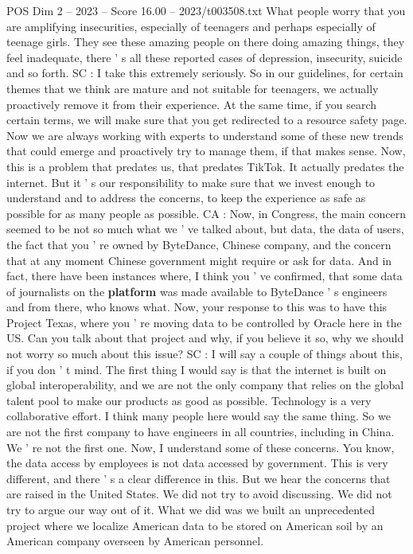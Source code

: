 \begin{textsample}{POS Dim 2 – 2023 – Score 16.00 – 2023/t003508.txt}
What people worry that you are amplifying insecurities, especially of teenagers and perhaps especially of teenage girls.
They see these amazing people on there doing amazing things, they feel inadequate, there ' s all these reported cases of depression, insecurity, suicide and so forth.
SC : I take this extremely seriously.
So in our guidelines, for certain themes that we think are mature and not suitable for teenagers, we actually proactively remove it from their experience.
At the same time, if you search certain terms, we will make sure that you get redirected to a resource safety page.
Now we are always working with experts to understand some of these new trends that could emerge and proactively try to manage them, if that makes sense.
Now, this is a problem that predates us, that predates TikTok.
It actually predates the internet.
But it ' s our responsibility to make sure that we invest enough to understand and to address the concerns, to keep the experience as safe as possible for as many people as possible.
CA : Now, in Congress, the main concern seemed to be not so much what we ' ve talked about, but data, the data of users, the fact that you ' re owned by ByteDance, Chinese company, and the concern that at any moment Chinese government might require or ask for data.
And in fact, there have been instances where, I think you ' ve confirmed, that some data of journalists on the \textbf{platform} was made available to ByteDance ' s engineers and from there, who knows what.
Now, your response to this was to have this Project Texas, where you ' re moving data to be controlled by Oracle here in the US.
Can you talk about that project and why, if you believe it so, why we should not worry so much about this issue?
SC : I will say a couple of things about this, if you don ' t mind.
The first thing I would say is that the internet is built on global interoperability, and we are not the only company that relies on the global talent pool to make our products as good as possible.
Technology is a very collaborative effort.
I think many people here would say the same thing.
So we are not the first company to have engineers in all countries, including in China.
We ' re not the first one.
Now, I understand some of these concerns.
You know, the data access by employees is not data accessed by government.
This is very different, and there ' s a clear difference in this.
But we hear the concerns that are raised in the United States.
We did not try to avoid discussing.
We did not try to argue our way out of it.
What we did was we built an unprecedented project where we localize American data to be stored on American soil by an American company overseen by American personnel.

\end{textsample}
